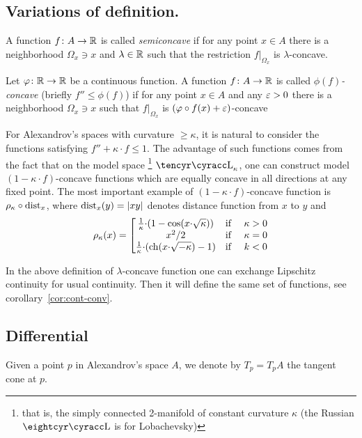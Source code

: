 \documentclass{article}
\begin{document}
\subsection{Variations of definition.}\label{variation-CF}

A function $f\colon A\to \mathbb{R}$ is called \textit{semiconcave} if for any point $x\in A$ there is a neighborhood $\Omega_x\ni x$ and $\lambda\in \mathbb{R}$ such that the restriction $f|_{\Omega_x}$ is $\lambda$-concave.

Let $\varphi\colon\mathbb{R}\to \mathbb{R}$ be a continuous function. 
A function $f\colon A\to \mathbb{R}$ is called \emph{$\phi(f)$-concave} (briefly $f''\le \phi(f)$) if for any point $x\in A$ and any $\varepsilon>0$ there is a neighborhood $\Omega_x\ni x$ such that $f|_{\Omega_x}$ is $(\varphi\circ f(x)+\varepsilon)$-concave

For Alexandrov's spaces with curvature $\ge \kappa$, it is natural to consider the functions satisfying $f''+\kappa{\cdot}f\le 1$.
The advantage of such functions comes from the fact that on the model space%
\footnote{\label{Lob_k} that is, 
the simply connected 2-manifold of constant curvature $\kappa$ 
(the Russian $\Lobm$ is for Lobachevsky)}  
$\Lob_\kappa$,  one can construct model $(1-\kappa{\cdot} f)$-concave functions which are equally concave in all directions at any fixed point.
The most important example of $(1-\kappa{\cdot} f)$-concave function is $\rho_\kappa\circ\operatorname{dist}_x$, where $\operatorname{dist}_x(y)=|x y|$ denotes distance function from $x$ to $y$ and
$$\label{rho_k}\rho_\kappa(x) =
\left[\begin{matrix} 
\tfrac1\kappa{\cdot} (1-\cos(x{\cdot}\sqrt{\kappa} ))  & {\text{if }} & \kappa > 0 \\
 x^2/2                          & {\text{if }} & \kappa=0 \\
\tfrac1\kappa {\cdot}(\operatorname{ch}(x{\cdot}\sqrt{-\kappa})-1) & {\text{if }} & k < 0
\end{matrix}\right.$$

In the above definition of $\lambda$-concave function one can exchange Lipschitz continuity for usual continuity. 
Then it will define the same set of functions, see corollary~\ref{cor:cont-conv}.





\subsection{Differential} 

Given a point $p$ in Alexandrov's space  $A$, we denote by \label{T_p} $T_p=T_p A$ the tangent cone at $p$.
\end{document}
